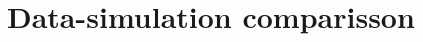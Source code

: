 
\section{Data-simulation comparisson}
\label{a:DataMC}

\renewcommand{\thefigure}{J.\arabic{figure}}

%

%


